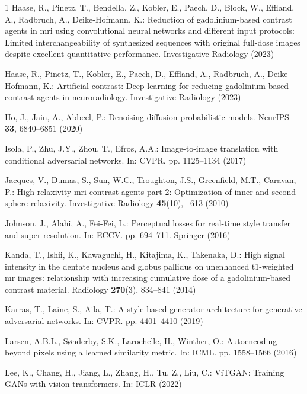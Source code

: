 \documentclass[a4paper,10pt]{article}
\begin{document}
\begin{thebibliography}{1}
Haase, R., Pinetz, T., Bendella, Z., Kobler, E., Paech, D., Block, W., Effland,
  A., Radbruch, A., Deike-Hofmann, K.: Reduction of gadolinium-based contrast
  agents in mri using convolutional neural networks and different input
  protocols: Limited interchangeability of synthesized sequences with original
  full-dose images despite excellent quantitative performance. Investigative
  Radiology  (2023)

Haase, R., Pinetz, T., Kobler, E., Paech, D., Effland, A., Radbruch, A.,
  Deike-Hofmann, K.: Artificial contrast: Deep learning for reducing
  gadolinium-based contrast agents in neuroradiology. Investigative Radiology
  (2023)

Ho, J., Jain, A., Abbeel, P.: Denoising diffusion probabilistic models. NeurIPS
    \textbf{33},  6840--6851 (2020)

Isola, P., Zhu, J.Y., Zhou, T., Efros, A.A.: Image-to-image translation with
  conditional adversarial networks. In: CVPR. pp. 1125--1134 (2017)

Jacques, V., Dumas, S., Sun, W.C., Troughton, J.S., Greenfield, M.T., Caravan,
  P.: High relaxivity mri contrast agents part 2: Optimization of inner-and
  second-sphere relaxivity. Investigative Radiology  \textbf{45}(10), ~613
  (2010)

Johnson, J., Alahi, A., Fei-Fei, L.: Perceptual losses for real-time style
  transfer and super-resolution. In: ECCV. pp. 694--711. Springer (2016)

Kanda, T., Ishii, K., Kawaguchi, H., Kitajima, K., Takenaka, D.: High signal
  intensity in the dentate nucleus and globus pallidus on unenhanced
  t1-weighted mr images: relationship with increasing cumulative dose of a
  gadolinium-based contrast material. Radiology  \textbf{270}(3),  834--841
  (2014)

Karras, T., Laine, S., Aila, T.: A style-based generator architecture for
  generative adversarial networks. In: CVPR. pp. 4401--4410 (2019)

Larsen, A.B.L., S{\o}nderby, S.K., Larochelle, H., Winther, O.: Autoencoding
  beyond pixels using a learned similarity metric. In: ICML. pp. 1558--1566
  (2016)

Lee, K., Chang, H., Jiang, L., Zhang, H., Tu, Z., Liu, C.: Vi{TGAN}: Training
  {GAN}s with vision transformers. In: ICLR (2022)


\end{thebibliography}
\end{document}
